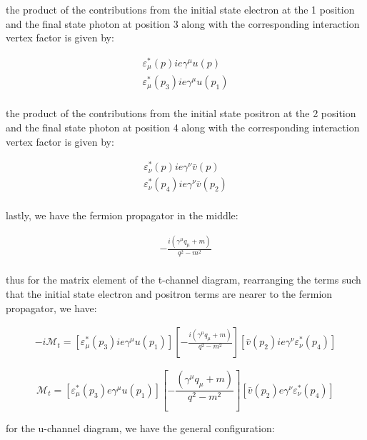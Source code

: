 \documentclass[11pt]{article}
\theoremstyle{definition}
\begin{document}
the product of the contributions from the initial state electron at the 1 position and the final state photon at position 3 along with the corresponding interaction vertex factor is given by:

\begin{align}
    \varepsilon^{*}_{\mu}(p)ie\gamma^{\mu}u(p)\\
    \varepsilon^{*}_{\mu}(p_3)ie\gamma^{\mu}u(p_1)\\
\end{align}

the product of the contributions from the initial state positron at the 2 position and the final state photon at position 4 along with the corresponding interaction vertex factor is given by:

\begin{align}
    \varepsilon^{*}_{\nu}(p)ie\gamma^{\nu}\bar{v}(p)\\
    \varepsilon^{*}_{\nu}(p_4)ie\gamma^{\nu}\bar{v}(p_2)\\
\end{align}

lastly, we have the fermion propagator in the middle:

\begin{align}
    -\frac{i(\gamma^{\mu} q_{\mu} + m)}{q^2-m^2}\\
\end{align}

thus for the matrix element of the t-channel diagram, rearranging the terms such that the initial state electron and positron terms are nearer to the fermion propagator, we have:

\begin{align}
    -i\mathcal{M}_t = 
    \left[
        \varepsilon^{*}_{\mu}(p_3)ie\gamma^{\mu}u(p_1)
    \right]
    \left[
        -\frac{i(\gamma^{\mu} q_{\mu} + m)}{q^2-m^2}
    \right]
    \left[
        \bar{v}(p_2)ie\gamma^{\nu}\varepsilon^{*}_{\nu}(p_4)
    \right]
\end{align}

\begin{equation}
\boxed{
    \mathcal{M}_t = 
    \left[
        \varepsilon^{*}_{\mu}(p_3)e\gamma^{\mu}u(p_1)
    \right]
    \left[
        -\frac{(\gamma^{\mu} q_{\mu} + m)}{q^2-m^2}
    \right]
    \left[
        \bar{v}(p_2)e\gamma^{\nu}\varepsilon^{*}_{\nu}(p_4)
    \right]
}
\end{equation}

for the u-channel diagram, we have the general configuration:
\end{document}
